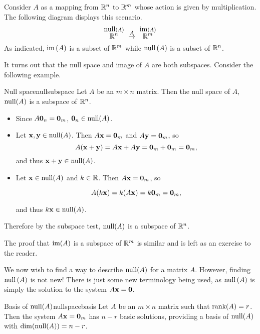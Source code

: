 Consider
$A$ as a mapping from $\mathbb{R}^{n}$ to $\mathbb{R}^{m}$ whose action is given by multiplication. The following diagram displays this scenario. 
\begin{equation*}
\overset{\func{null} \left( A\right) }{\R^{n}}\ \overset{A}{\rightarrow }\ 
\overset{
\func{im}\left( A\right) }{\R^{m}}
\end{equation*}
As indicated, $\mbox{im}\left( A\right) $ is a subset of $\mathbb{R}^{m}$
while $\mbox{null} \left( A\right) $ is a subset of $\mathbb{R}^{n}$.

It turns out that the null space and image of $A$ are both subspaces. Consider the following example.

\begin{example}{Null space}{nullsubspace}
Let $A$ be an $m\times n$ matrix. Then the null space of $A$, $\mbox{null}(A)$ is 
a subspace of $\mathbb{R}^n$.
\end{example}

\begin{solution}
\begin{itemize}
\item Since $A{\bf 0}_n={\bf 0}_m$, 
${\bf 0}_n\in\mbox{null}(A)$.

\item Let ${\bf x},{\bf y}\in\mbox{null}(A)$. 
Then $A{\bf x}={\bf 0}_m$ and $A{\bf y}={\bf 0}_m$, so
\[ A({\bf x}+{\bf y})=A{\bf x}+A{\bf y} = {\bf 0}_m+{\bf 0}_m={\bf 0}_m,\]
and thus ${\bf x}+{\bf y}\in\mbox{null}(A)$.
\item Let ${\bf x}\in\mbox{null}(A)$ and $k\in\mathbb{R}$.
Then $A{\bf x}={\bf 0}_m$, so

\[ A(k{\bf x}) = k(A{\bf x})=k{\bf 0}_m={\bf 0}_m,\]

and thus $k{\bf x}\in\mbox{null}(A)$.
\end{itemize}
Therefore by the subspace test, $\mbox{null}(A)$ is a subspace of $\mathbb{R}^n$.

\end{solution}

The proof that $\mbox{im}(A)$ is a subspace of $\mathbb{R}^m$ is similar and is left as an exercise to the reader. 

We now wish to find a way to describe $\mbox{null}(A)$ for a matrix $A$. However, finding $\mbox{null} \left( A\right)$ is not new! There is just some new
terminology being used, as $\mbox{null} \left( A\right) $ is simply the solution
to the system $A{\bf x}={\bf 0}$.

\begin{theorem}{Basis of $\mbox{null}(A)$}{nullspacebasis}
Let $A$ be an $m \times n$ matrix such that $\mbox{rank}(A) = r$. Then the system $A{\bf x}={\bf 0}_m$ has $n-r$ basic solutions, providing a basis of $\mbox{null}(A)$ with $\dim(\mbox{null}(A))=n-r$.
\end{theorem}

